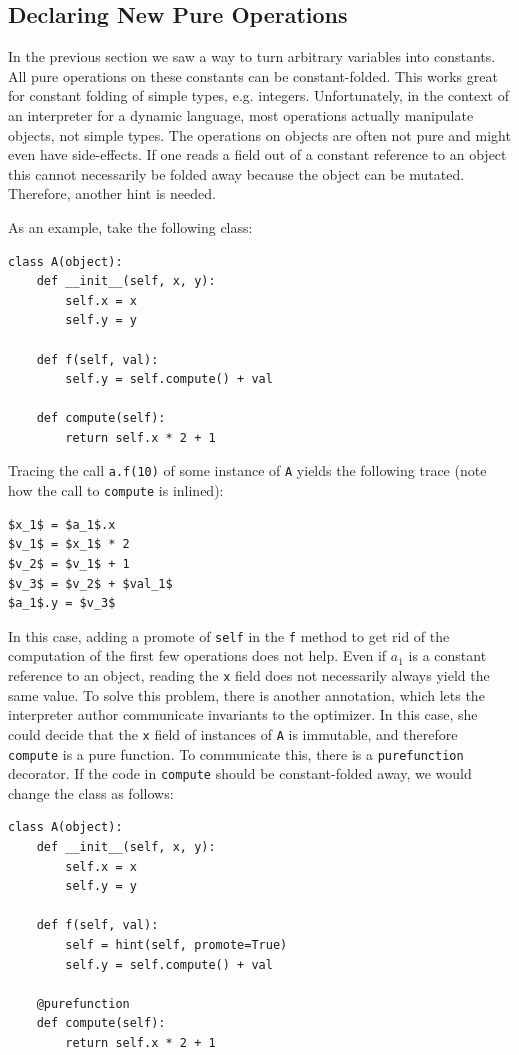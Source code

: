 \documentclass{sigplanconf}
\begin{document}
\subsection{Declaring New Pure Operations}

In the previous section we saw a way to turn arbitrary variables into constants. All
pure operations on these constants can be constant-folded. This works great for
constant folding of simple types, e.g. integers. Unfortunately, in the context of an
interpreter for a dynamic
language, most operations actually manipulate objects, not simple types. The
operations on objects are often not pure and might even have side-effects. If
one reads a field out of a constant reference to an object this cannot
necessarily be folded away because the object can be mutated. Therefore, another
hint is needed.

As an example, take the following class:

\begin{lstlisting}[mathescape,basicstyle=\ttfamily]
class A(object):
    def __init__(self, x, y):
        self.x = x
        self.y = y

    def f(self, val):
        self.y = self.compute() + val

    def compute(self):
        return self.x * 2 + 1
\end{lstlisting}

Tracing the call \texttt{a.f(10)} of some instance of \texttt{A} yields the following
trace (note how the call to \texttt{compute} is inlined):
%
\begin{lstlisting}[mathescape,basicstyle=\ttfamily]
$x_1$ = $a_1$.x
$v_1$ = $x_1$ * 2
$v_2$ = $v_1$ + 1
$v_3$ = $v_2$ + $val_1$
$a_1$.y = $v_3$
\end{lstlisting}

In this case, adding a promote of \texttt{self} in the \texttt{f} method to get rid of the
computation of the first few operations does not help. Even if $a_1$ is a
constant reference to an object, reading the \texttt{x} field does not necessarily
always yield the same value. To solve this problem, there is another annotation,
which lets the interpreter author communicate invariants to the optimizer. In
this case, she could decide that the \texttt{x} field of instances of \texttt{A} is
immutable, and therefore \texttt{compute}
is a pure function. To communicate this, there is a \texttt{purefunction} decorator.
If the code in \texttt{compute} should be constant-folded away, we would change the
class as follows:
\begin{lstlisting}[mathescape,basicstyle=\ttfamily]
class A(object):
    def __init__(self, x, y):
        self.x = x
        self.y = y

    def f(self, val):
        self = hint(self, promote=True)
        self.y = self.compute() + val

    @purefunction
    def compute(self):
        return self.x * 2 + 1
\end{lstlisting}
\end{document}
